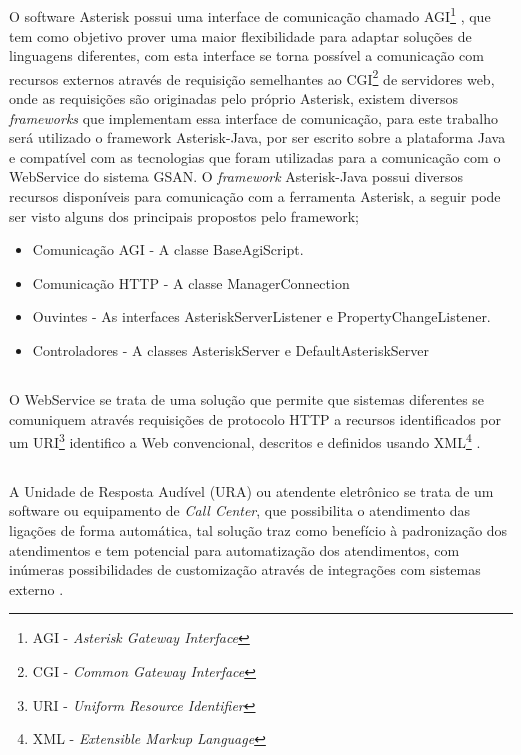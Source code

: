 \subsection{\fontsize{12}{1} }
O software Asterisk possui uma interface de comunicação chamado AGI\footnote{AGI - \textit{Asterisk Gateway Interface}} \cite{asteriskAgi}, que tem como objetivo prover uma maior flexibilidade para adaptar soluções de linguagens diferentes, com esta interface se torna possível a comunicação com recursos externos através de requisição semelhantes ao CGI\footnote{CGI - \textit{Common Gateway Interface}} de servidores web, onde as requisições são originadas pelo próprio Asterisk, existem diversos \textit{frameworks} que implementam essa interface de comunicação, para este trabalho será utilizado o framework Asterisk-Java, por ser escrito sobre a plataforma Java e compatível com as tecnologias que foram utilizadas para a comunicação com o WebService do sistema GSAN.
O \textit{framework} Asterisk-Java possui diversos recursos disponíveis para comunicação com a ferramenta Asterisk, a seguir pode ser visto alguns dos principais propostos pelo framework;

\begin{itemize}
	\item Comunicação AGI - A classe BaseAgiScript.
	\item Comunicação HTTP - A classe ManagerConnection
	\item Ouvintes - As interfaces AsteriskServerListener e PropertyChangeListener.
	\item Controladores - A classes AsteriskServer e DefaultAsteriskServer
\end{itemize}


\subsection{\fontsize{12}{1} }
O WebService se trata de uma solução que permite que sistemas diferentes se comuniquem através requisições de protocolo HTTP a recursos identificados por um URI\footnote{URI - \textit{Uniform Resource Identifier}}  identifico a Web convencional, descritos e definidos usando XML\footnote{XML - \textit{Extensible Markup Language}} .

\subsection{\fontsize{12}{1} }
A Unidade de Resposta Audível\label{key:URA} (URA) ou atendente eletrônico se trata de um software ou equipamento de \textit{Call Center}, que possibilita o atendimento das ligações de forma automática, tal solução traz como benefício à padronização dos atendimentos e tem potencial para automatização dos atendimentos, com inúmeras possibilidades de customização através de integrações com sistemas externo \cite{VIEIRA:2007}.

